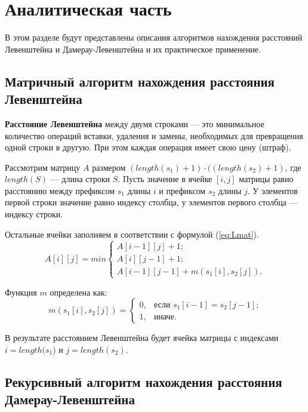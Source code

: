 \chapter{Аналитическая часть}
В этом разделе будут представлены описания алгоритмов нахождения расстояний Левенштейна и Дамерау-Левенштейна и их практическое применение.
\section{Матричный алгоритм нахождения \newline расстояния Левенштейна}

\textbf{Расстояние Левенштейна} между двумя строками --- это минимальное количество операций вставки, удаления и замены, необходимых для превращения одной строки в другую.
При этом каждая операция имеет свою цену (штраф).

Рассмотрим матрицу $A$ размером $(length(s_{1})+ 1) \cdot ((length(s_{2}) + 1)$, где $length(S)$ --- длина строки $S$. Пусть значение в ячейке $[i, j]$ матрицы равно расстоянию между префиксом $s_{1}$ длины $i$ и префиксом $s_{2}$ длины $j$. У элементов первой строки значение равно индексу столбца, у элементов первого столбца --- индексу строки.

Остальные ячейки заполняем в соответствии с формулой (\ref{eq:Lmat}).
\begin{equation}
	\label{eq:Lmat}
	A[i][j] = min \begin{cases}
		A[i-1][j] + 1;\\
		A[i][j-1] + 1;\\
		A[i-1][j-1] + m(s_{1}[i], s_{2}[j]).
	\end{cases}
\end{equation}

Функция $m$ определена как:
\begin{equation}
	\label{eq:Lm}
	m(s_{1}[i], s_{2}[j]) = \begin{cases}
		0, &\text{если $s_{1}[i-1] = s_{2}[j-1]$;}\\
		1, &\text{иначе.}
	\end{cases}
\end{equation}

В результате расстоянием Левенштейна будет ячейка матрицы с индексами $i = length(s_{1}$) и $j = length(s_{2})$.

\section{Рекурсивный алгоритм нахождения расстояния Дамерау-Левенштейна}

